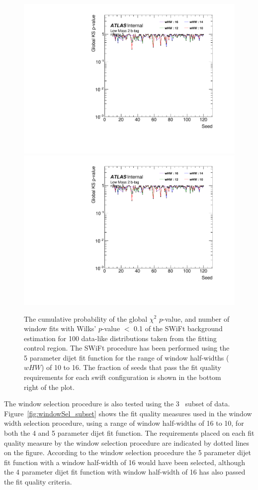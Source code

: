 \begin{figure}[!htb]
\captionsetup[subfigure]{aboveskip=0pt,justification=centering}
\centering
{} {
  \includegraphics[width=0.49\linewidth, angle=0,page=7]{figs/Dibjet/LowMass/FitStudy_min566/windowSel_corrFitCR_dataLike_5para.pdf}
}  \hspace{-8mm}
 {
  \includegraphics[width=0.49\linewidth, angle=0,page=9]{figs/Dibjet/LowMass/FitStudy_min566/windowSel_corrFitCR_dataLike_5para.pdf}
}

\caption{\label{fig:windowSel_dataLike}
  The cumulative probability of the global $\chi^{2}$ \mbox{$p$-value}, %
  and number of window fits with Wilks' \mbox{$p$-value} $<$ 0.1 of the SWiFt background estimation for
  100 data-like distributions taken from the \lm{} fitting control region.
  The SWiFt procedure has been performed using the 5 parameter dijet fit function
  for the range of window half-widths ($wHW$) of 10 to 16.
  The fraction of seeds that pass the fit quality requirements for each swift configuration is shown in the bottom right of the plot.
}
\end{figure}

The window selection procedure is also tested using the 3~\ifb{} subset of data.
Figure~\ref{fig:windowSel_subset} shows the fit quality measures used in the window width selection procedure,
using a range of window half-widths of 16 to 10, for both the 4 and 5 parameter dijet fit function.
The requirements placed on each fit quality measure by the window selection procedure are indicated by dotted lines on the figure.
According to the window selection procedure the 5 parameter dijet fit function with a window half-width of 16 would have been selected,
although the 4 parameter dijet fit function with window half-width of 16 has also passed the fit quality criteria.

